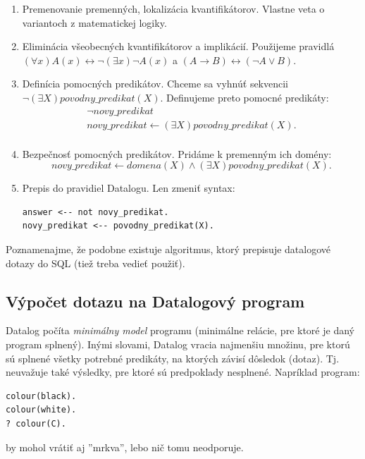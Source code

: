 \documentclass[10pt,a4paper]{article}
\begin{document}
\begin{enumerate}
\item Premenovanie premenných, lokalizácia kvantifikátorov. Vlastne veta o variantoch z matematickej logiky.

\item Eliminácia všeobecných kvantifikátorov a implikácií. Použijeme pravidlá $(\forall x)A(x) \leftrightarrow \neg (\exists x) \neg A(x)$ a $(A \rightarrow B) \leftrightarrow (\neg A \vee B)$.

\item Definícia pomocných predikátov. Chceme sa vyhnúť sekvencii $\neg (\exists X) povodny\_predikat(X)$. Definujeme preto pomocné predikáty:
$$
\begin{array}{l}
\neg novy\_predikat \\
novy\_predikat \leftarrow (\exists X) povodny\_predikat(X).\\
\end{array}
$$

\item Bezpečnosť pomocných predikátov. Pridáme k premenným ich domény:
$$
novy\_predikat \leftarrow domena(X) \wedge (\exists X) povodny\_predikat(X).
$$

\item Prepis do pravidiel Datalogu. Len zmeniť syntax:
\begin{verbatim}
answer <-- not novy_predikat.
novy_predikat <-- povodny_predikat(X).
\end{verbatim}

\end{enumerate}

Poznamenajme, že podobne existuje algoritmus, ktorý prepisuje datalogové dotazy do SQL (tiež treba vedieť použiť).

\subsection{Výpočet dotazu na Datalogový program}

Datalog počíta \emph{minimálny model} programu (minimálne relácie, pre ktoré je daný program splnený). Inými slovami, Datalog vracia najmenšiu množinu, pre ktorú sú splnené všetky potrebné predikáty, na ktorých závisí dôsledok (dotaz). Tj. neuvažuje také výsledky, pre ktoré sú predpoklady nesplnené. Napríklad program:
\begin{verbatim}
colour(black).
colour(white).
? colour(C).
\end{verbatim}
by mohol vrátiť aj ''mrkva'', lebo nič tomu neodporuje.
\end{document}
